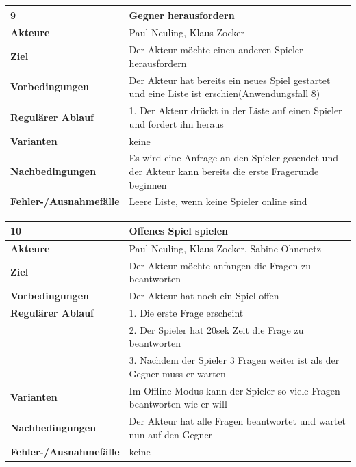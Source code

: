 \documentclass[fontsize=12pt,paper=a4,twoside]{scrartcl}
\begin{document}
\begin{table}
	[H] \label{9} 
	\begin{tabular}
		{|l|p{10cm}|} \hline \textbf{9} & \textbf{Gegner herausfordern} \\
		\hline \textbf{Akteure} & Paul Neuling, Klaus Zocker\\
		\hline \textbf{Ziel} & Der Akteur möchte einen anderen Spieler herausfordern\\
		\hline \textbf{Vorbedingungen} & Der Akteur hat bereits ein neues Spiel gestartet und eine Liste ist erschien(Anwendungsfall 8) \\
		\hline \textbf{Regulärer Ablauf} & 1. Der Akteur drückt in der Liste auf einen Spieler und fordert ihn heraus\\
		\hline \textbf{Varianten} & keine \\
		\hline \textbf{Nachbedingungen} & Es wird eine Anfrage an den Spieler gesendet und der Akteur kann bereits die erste Fragerunde beginnen\\
		\hline \textbf{Fehler-/Ausnahmefälle} & Leere Liste, wenn keine Spieler online sind \\
		\hline 
	\end{tabular}
\end{table}

\begin{table}
	[H] \label{10} 
	\begin{tabular}
		{|l|p{10cm}|} \hline \textbf{10} & \textbf{Offenes Spiel spielen} \\
		\hline \textbf{Akteure} & Paul Neuling, Klaus Zocker, Sabine Ohnenetz\\
		\hline \textbf{Ziel} & Der Akteur möchte anfangen die Fragen zu beantworten\\
		\hline \textbf{Vorbedingungen} & Der Akteur hat noch ein Spiel offen\\
		\hline \textbf{Regulärer Ablauf} & 1. Die erste Frage erscheint\\
		&2. Der Spieler hat 20sek Zeit die Frage zu beantworten\\
		&3. Nachdem der Spieler 3 Fragen weiter ist als der Gegner muss er warten\\
		\hline \textbf{Varianten} & Im Offline-Modus kann der Spieler so viele Fragen beantworten wie er will \\
		\hline \textbf{Nachbedingungen} & Der Akteur hat alle Fragen beantwortet und wartet nun auf den Gegner\\
		\hline \textbf{Fehler-/Ausnahmefälle} & keine \\
		\hline 
	\end{tabular}
\end{table}
\end{document}
